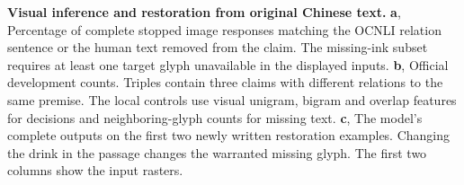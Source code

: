 \textbf{Visual inference and restoration from original Chinese text.}
\textbf{a}, Percentage of complete stopped image responses matching the OCNLI relation sentence or the human text removed from the claim. The missing-ink subset requires at least one target glyph unavailable in the displayed inputs.
\textbf{b}, Official development counts. Triples contain three claims with different relations to the same premise. The local controls use visual unigram, bigram and overlap features for decisions and neighboring-glyph counts for missing text.
\textbf{c}, The model's complete outputs on the first two newly written restoration examples. Changing the drink in the passage changes the warranted missing glyph. The first two columns show the input rasters.
